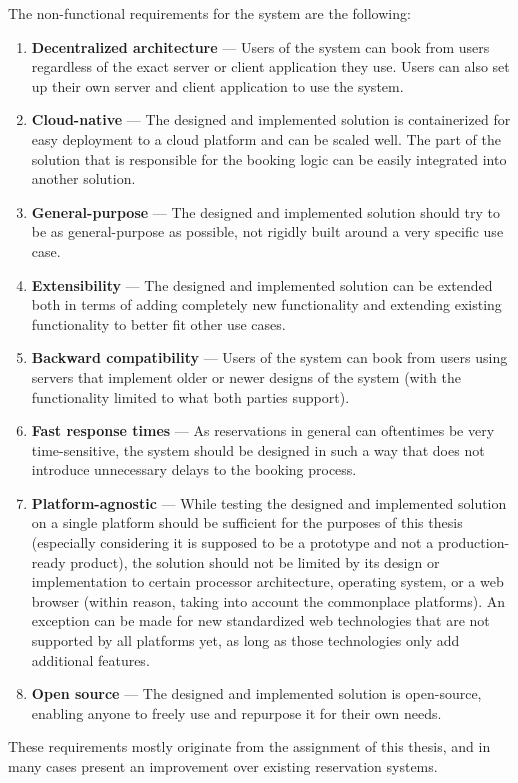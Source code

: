 The non-functional requirements for the system are the following:
\begin{enumerate}[label=\textbf{N\arabic*}, ref=\labelenumi]
    \item \label{req:decentralized_architecture} \textbf{Decentralized architecture} --- Users of the system can book from users regardless of the exact server or client application they use. Users can also set up their own server and client application to use the system.
    \item \label{req:cloud_native} \textbf{Cloud-native} --- The designed and implemented solution is containerized for easy deployment to a cloud platform and can be scaled well. The part of the solution that is responsible for the booking logic can be easily integrated into another solution.
    \item \label{req:general_purpose} \textbf{General-purpose} --- The designed and implemented solution should try to be as general-purpose as possible, not rigidly built around a very specific use case.
    \item \label{req:extensibility} \textbf{Extensibility} --- The designed and implemented solution can be extended both in terms of adding completely new functionality and extending existing functionality to better fit other use cases.
    \item \label{req:backward_compatibility} \textbf{Backward compatibility} --- Users of the system can book from users using servers that implement older or newer designs of the system (with the functionality limited to what both parties support).
    \item \label{req:fast_response_times} \textbf{Fast response times} --- As reservations in general can oftentimes be very time-sensitive, the system should be designed in such a way that does not introduce unnecessary delays to the booking process.
    \item \label{req:platform_agnostic} \textbf{Platform-agnostic} --- While testing the designed and implemented solution on a single platform should be sufficient for the purposes of this thesis (especially considering it is supposed to be a prototype and not a production-ready product), the solution should not be limited by its design or implementation to certain processor architecture, operating system, or a web browser (within reason, taking into account the commonplace platforms). An exception can be made for new standardized web technologies that are not supported by all platforms yet, as long as those technologies only add additional features.
    \item \label{req:open_source} \textbf{Open source} --- The designed and implemented solution is open-source, enabling anyone to freely use and repurpose it for their own needs.
\end{enumerate}

These requirements mostly originate from the assignment of this thesis, and in many cases present an improvement over existing reservation systems.
